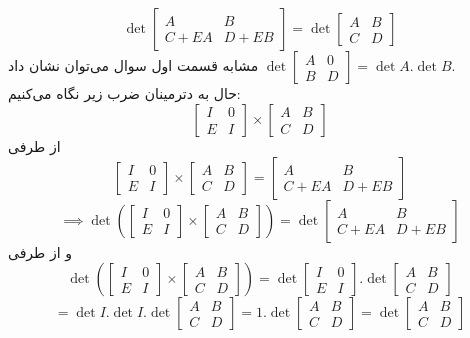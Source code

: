 \documentclass[12pt,a4paper]{article}
\begin{document}
\subsection{}
$$
\det \begin{bmatrix}A&B\\C+EA&D+EB\end{bmatrix} = \det \begin{bmatrix}A&B\\C&D\end{bmatrix}
$$
مشابه قسمت اول سوال می‌توان نشان داد
$\det \begin{bmatrix}A&0\\B&D\end{bmatrix} = \det A . \det B$.
\\
حال به دترمینان ضرب زیر نگاه می‌کنیم:
$$\begin{bmatrix}I&0\\E&I\end{bmatrix}\times
\begin{bmatrix}A&B\\C&D\end{bmatrix}$$
از طرفی 
$$\begin{bmatrix}I&0\\E&I\end{bmatrix}\times
\begin{bmatrix}A&B\\C&D\end{bmatrix} = \begin{bmatrix}A&B\\C+EA&D+EB\end{bmatrix}$$$$ \implies
\det \left(\begin{bmatrix}I&0\\E&I\end{bmatrix}\times
\begin{bmatrix}A&B\\C&D\end{bmatrix} \right)= \det \begin{bmatrix}A&B\\C+EA&D+EB\end{bmatrix}
$$
و از طرفی
$$
\det \left(\begin{bmatrix}I&0\\E&I\end{bmatrix}\times
\begin{bmatrix}A&B\\C&D\end{bmatrix} \right)=
\det \begin{bmatrix}I&0\\E&I\end{bmatrix} .
\det \begin{bmatrix}A&B\\C&D\end{bmatrix}$$$$ = \det I.\det I . \det \begin{bmatrix}A&B\\C&D\end{bmatrix} = 1.\det \begin{bmatrix}A&B\\C&D\end{bmatrix} = \det \begin{bmatrix}A&B\\C&D\end{bmatrix}
$$
\end{document}
